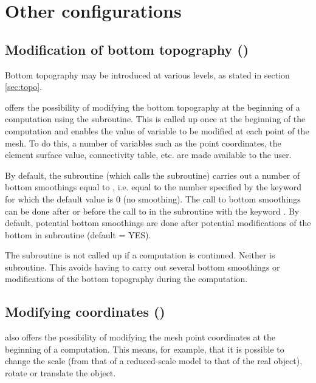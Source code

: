 \chapter{Other configurations}

\section{Modification of bottom topography ()}

Bottom topography may be introduced at various levels, as stated
in section \ref{sec:topo}.

 offers the possibility of modifying the bottom topography at the
beginning of a computation using the  subroutine.
This is called up once at the beginning of the computation and enables the value
of variable  to be modified at each point of the mesh.
To do this, a number of variables such as the point coordinates, the element
surface value, connectivity table, etc. are made available to the user.

By default, the  subroutine (which calls the
 subroutine) carries out a number
of bottom smoothings equal to ,
i.e. equal to the number specified by the keyword
for which the default value is 0 (no smoothing).
The call to bottom smoothings can be done after or before the call to
 in the  subroutine with the
keyword .
By default, potential bottom smoothings are done after potential modifications
of the bottom in  subroutine (default = YES).

The  subroutine is not called up
if a computation is continued.
Neither is  subroutine.
This avoids having to carry out several bottom smoothings or modifications
of the bottom topography during the computation.


\section{Modifying coordinates ()}

 also offers the possibility of modifying the mesh point coordinates
at the beginning of a computation.
This means, for example, that it is possible to change the scale
(from that of a reduced-scale model to that of the real object),
rotate or translate the object.

